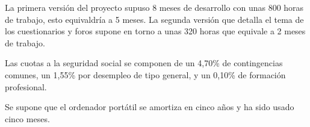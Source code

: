 La primera versión del proyecto supuso 8 meses de desarrollo con unas 800 horas de trabajo, esto equivaldría a 5 meses. La segunda versión que detalla el tema de los cuestionarios y foros supone en torno a unas 320 horas que equivale a 2 meses de trabajo.
\begin{table}[H]
	\centering
	\caption{Costes de personal}
\end{table}
Las cuotas a la seguridad social se componen de un 4,70\% de contingencias comunes, un 1,55\% por desempleo de tipo general, y un 0,10\% de formación profesional.

Se supone que el ordenador portátil se amortiza en cinco años y ha sido usado cinco meses.
\begin{table}[H]
	\centering
	\caption{Costes de hardware}
\end{table}

\begin{table}[H]
	\centering
	\caption{Costes varios}
\end{table}

